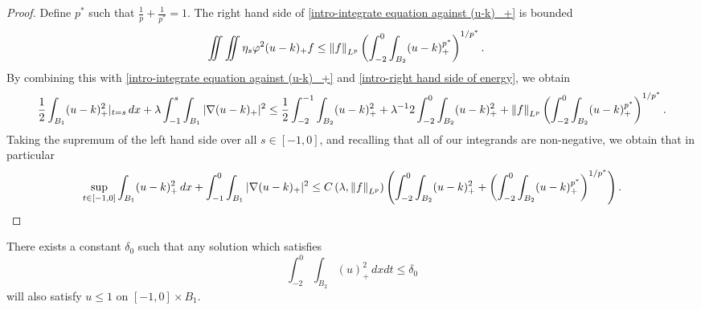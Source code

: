 \begin{proof}
Define $p^*$ such that $\frac{1}{p} + \frac{1}{p^*} = 1$.  The right hand side of \eqref{intro-integrate equation against (u-k)_+} is bounded
\begin{equation*} \begin{aligned}
\iint \iint \eta_s \varphi^2 (u-k)_+ f 
&\leq \left\lVert f\right\rVert_{L^p} \left(  \int_{-2}^0 \int_{B_2} (u-k)_+^{p^*}  \right)^{1/p^*}.
\end{aligned} \end{equation*}
By combining this with \eqref{intro-integrate equation against (u-k)_+} and \eqref{intro-right hand side of energy}, we obtain
\[ \frac{1}{2}\int_{B_1} (u-k)_+^2|_{t=s} \,dx + \lambda \int_{-1}^s \int_{B_1} |\nabla(u-k)_+|^2 \leq \frac{1}{2} \int_{-2}^{-1} \int_{B_2} (u-k)_+^2 + \lambda^{-1} 2 \int_{-2}^0 \int_{B_2} (u-k)_+^2 + \left\lVert f\right\rVert_{L^p} \left(  \int_{-2}^0 \int_{B_2} (u-k)_+^{p^*}  \right)^{1/p^*}. \]
Taking the supremum of the left hand side over all $s \in [-1,0]$, and recalling that all of our integrands are non-negative, we obtain that in particular
\[ \sup_{t \in [-1,0]} \int_{B_1} (u-k)_+^2 \,dx + \int_{-1}^0 \int_{B_1} |\nabla(u-k)_+|^2 \leq C\left( \lambda, \left\lVert f\right\rVert_{L^p} \right) \left(  \int_{-2}^{0} \int_{B_2} (u-k)_+^2 + \left(  \int_{-2}^0 \int_{B_2} (u-k)_+^{p^*}  \right)^{1/p^*}  \right). \]


\end{proof}

\begin{theorem}
There exists a constant $\delta_0$ such that any solution which satisfies
\[ \int_{-2}^0 \int_{B_2} (u)_+^2 \,dxdt \leq \delta_0 \]
will also satisfy $u \leq 1$ on $[-1,0]\times B_1$.  
\end{theorem}

